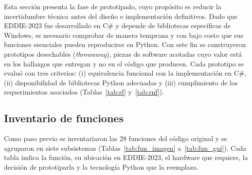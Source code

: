 Esta sección presenta la fase de prototipado, cuyo propósito es reducir la incertidumbre técnica antes del diseño e implementación definitivos. Dado que EDDIE-2023 fue desarrollado en C\# y depende de bibliotecas específicas de Windows, es necesario comprobar de manera temprana y con bajo costo que sus funciones esenciales pueden reproducirse en Python. Con este fin se construyeron prototipos desechables (\textit{throwaway}), piezas de software acotadas cuyo valor está en los hallazgos que entregan y no en el código que producen. Cada prototipo se evaluó con tres criterios: (i) equivalencia funcional con la implementación en C\#, (ii) disponibilidad de bibliotecas Python adecuadas y (iii) cumplimiento de los requerimientos asociados (Tablas~\ref{tab:rf} y~\ref{tab:rnf}).

\subsection{Inventario de funciones}

Como paso previo se inventariaron las 28 funciones del código original y se agruparon en siete subsistemas (Tablas~\ref{tab:fun_imagen} a~\ref{tab:fun_gui}). Cada tabla indica la función, su ubicación en EDDIE-2023, el hardware que requiere, la decisión de prototiparla y la tecnología Python que la reemplaza.

\newcommand{\funhead}{\toprule \textbf{ID} & \textbf{Función} & \textbf{EDDIE-2023} & \textbf{Hardware} & \textbf{¿Prototipar? / Tecnología} \\ \midrule}

